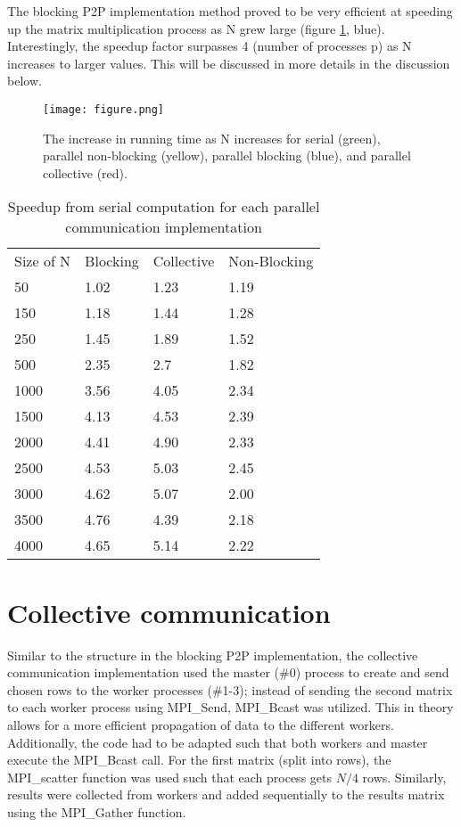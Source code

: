 \documentclass[12pt]{report}
\begin{document}
The blocking P2P implementation method proved to be very efficient at speeding up the matrix multiplication process as N grew large (figure \ref{fig:runtime}, blue). Interestingly, the speedup factor surpasses 4 (number of processes p) as N increases to larger values. This will be discussed in more details in the discussion below.

\begin{figure}
  \texttt{[image: figure.png]}
  \caption{The increase in running time as N increases for serial (green), parallel non-blocking (yellow), parallel blocking (blue), and parallel collective (red).}
  \label{fig:runtime}
\end{figure}

\begin{table}[]
\centering
\caption{Speedup from serial computation for each parallel communication implementation}
\label{table}
\begin{tabular}{llll}
Size of N                 & Blocking & Collective & Non-Blocking \\ \cline{2-4} 
\multicolumn{1}{l|}{50}   & 1.02     & 1.23       & 1.19         \\
\multicolumn{1}{l|}{150}  & 1.18     & 1.44       & 1.28         \\
\multicolumn{1}{l|}{250}  & 1.45     & 1.89       & 1.52         \\
\multicolumn{1}{l|}{500}  & 2.35     & 2.7        & 1.82         \\
\multicolumn{1}{l|}{1000} & 3.56     & 4.05       & 2.34         \\
\multicolumn{1}{l|}{1500} & 4.13     & 4.53       & 2.39         \\
\multicolumn{1}{l|}{2000} & 4.41     & 4.90       & 2.33         \\
\multicolumn{1}{l|}{2500} & 4.53     & 5.03       & 2.45         \\
\multicolumn{1}{l|}{3000} & 4.62     & 5.07       & 2.00         \\
\multicolumn{1}{l|}{3500} & 4.76     & 4.39       & 2.18         \\
\multicolumn{1}{l|}{4000} & 4.65     & 5.14       & 2.22        
\end{tabular}
\end{table}

\section{Collective communication}
Similar to the structure in the blocking P2P implementation, the collective communication implementation used the master (\#0) process to create and send chosen rows to the worker processes (\#1-3); instead of sending the second matrix to each worker process using MPI\_Send, MPI\_Bcast was utilized. This in theory allows for a more efficient propagation of data to the different workers. Additionally, the code had to be adapted such that both workers and master execute the MPI\_Bcast call. For the first matrix (split into rows), the MPI\_scatter function was used such that each process gets $N/4$ rows. Similarly, results were collected from workers and added sequentially to the results matrix using the MPI\_Gather function.  
\end{document}
